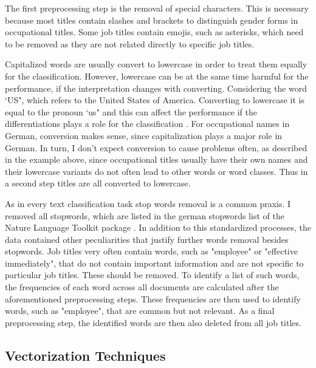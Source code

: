 \documentclass[12pt, a4paper, titlepage]{article}
\begin{document}
The first preprocessing step is the removal of special characters. This is necessary because most titles contain slashes and brackets to distinguish gender forms in occupational titles. Some job titles contain emojis, such as asterisks, which need to be removed as they are not related directly to specific job titles. 

Capitalized words are usually convert to lowercase in order to treat them equally for the classification. However, lowercase can be at the same time harmful for the performance, if the interpretation changes with converting. Considering the word `US", which refers to the United States of America. Converting to lowercase it is equal to the pronoun `us" and this can affect the performance if the differentiations plays a role for the classification \citep{kowsari2019text}. For occupational names in German, conversion makes sense, since capitalization plays a major role in German. In turn, I don't expect conversion to cause problems often, as described in the example above, since occupational titles usually have their own names and their lowercase variants do not often lead to other words or word classes. Thus in a second step titles are all converted to lowercase. 

As in every text classification task stop words removal is a common praxis. I removed all stopwords, which are listed in the german stopwords list of the Nature Language Toolkit package \citep{bird2009}. In addition to this standardized processes, the data contained other peculiarities that justify further words removal besides stopwords. Job titles very often contain words, such as "employee" or "effective immediately", that do not contain important information and are not specific to particular job titles. These should be removed. To identify a list of such words, the frequencies of each word across all documents are calculated after the aforementioned preprocessing steps. These frequencies are then used to identify words, such as "employee", that are common but not relevant. As a final preprocessing step, the identified words are then also deleted from all job titles. 

\subsection{Vectorization Techniques}
\end{document}
